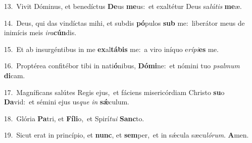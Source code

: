 {\numbfont\textcolor{\numbcolor}{13.}}~Vivit Dóminus, et benedíctus \textbf{De}\-us \textbf{me}\-us:~\star et exaltétur Deus sa\-\textit{lú}\-\textit{tis} \textbf{me}\-æ.\par
{\numbfont\textcolor{\numbcolor}{14.}}~Deus, qui das vindíctas mihi, et subdis \textbf{pó}\-pulos \textbf{sub} me:~\star liberátor meus de inimícis meis \textit{i}\-\textit{ra}\textbf{cún}dis.\par
{\numbfont\textcolor{\numbcolor}{15.}}~Et ab insurgéntibus in me \textbf{ex}\-al\-\textbf{tá}\-\textbf{bis} me:~\star a viro iníquo e\-\textit{rí}\-\textit{pi}\textbf{es} me.\par
{\numbfont\textcolor{\numbcolor}{16.}}~Proptérea confitébor tibi in nati\-\textbf{ó}\-nibus, \textbf{Dó}\-\textbf{mi}ne:~\star et nómini tuo \textit{psal}\-\textit{mum} \textbf{di}\-cam.\par
{\numbfont\textcolor{\numbcolor}{17.}}~Magníficans salútes Regis ejus,~\dagger et fáciens misericórdiam Christo \textbf{su}\-o \textbf{Da}\-vid:~\star et sémini ejus us\textit{que} \textit{in} \textbf{sǽ}\-culum.\par
{\numbfont\textcolor{\numbcolor}{18.}}~Glória \textbf{Pa}\-tri, et \textbf{Fí}\-\textbf{li}o,~\star et Spirí\-\textit{tu}\-\textit{i} \textbf{Sanc}\-to.\par
{\numbfont\textcolor{\numbcolor}{19.}}~Sicut erat in princípio, et \textbf{nunc}\-, et \textbf{sem}\-per,~\star et in sǽcula sæcu\-\textit{ló}\-\textit{rum}. \textbf{A}\-men.\par

